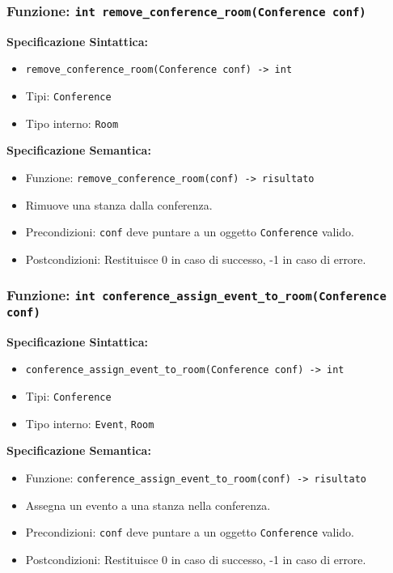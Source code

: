 \documentclass[11pt]{scrartcl} %
\begin{document}
\subsubsection{Funzione: \texttt{int remove\_conference\_room(Conference conf)}}

\textbf{Specificazione Sintattica:}
\begin{itemize}
\item \texttt{remove\_conference\_room(Conference conf) -> int}
\item Tipi: \texttt{Conference}
\item Tipo interno: \texttt{Room}
\end{itemize}

\textbf{Specificazione Semantica:}
\begin{itemize}
\item Funzione: \texttt{remove\_conference\_room(conf) -> risultato}
\item Rimuove una stanza dalla conferenza.
\item Precondizioni: \texttt{conf} deve puntare a un oggetto \texttt{Conference} valido.
\item Postcondizioni: Restituisce 0 in caso di successo, -1 in caso di errore.
\end{itemize}

\subsubsection{Funzione: \texttt{int conference\_assign\_event\_to\_room(Conference conf)}}

\textbf{Specificazione Sintattica:}
\begin{itemize}
\item \texttt{conference\_assign\_event\_to\_room(Conference conf) -> int}
\item Tipi: \texttt{Conference}
\item Tipo interno: \texttt{Event}, \texttt{Room}
\end{itemize}

\textbf{Specificazione Semantica:}
\begin{itemize}
\item Funzione: \texttt{conference\_assign\_event\_to\_room(conf) -> risultato}
\item Assegna un evento a una stanza nella conferenza.
\item Precondizioni: \texttt{conf} deve puntare a un oggetto \texttt{Conference} valido.
\item Postcondizioni: Restituisce 0 in caso di successo, -1 in caso di errore.
\end{itemize}
\end{document}
